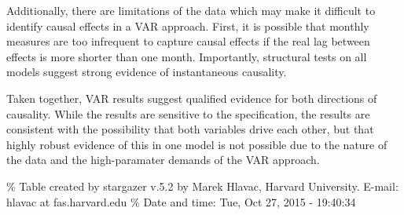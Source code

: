 \documentclass[12pt,article]{article}
\begin{document}
Additionally, there are limitations of the data which may make it
difficult to identify causal effects in a VAR approach. First, it is
possible that monthly measures are too infrequent to capture causal
effects if the real lag between effects is more shorter than one month.
Importantly, structural tests on all models suggest strong evidence of
instantaneous causality.

Taken together, VAR results suggest qualified evidence for both
directions of causality. While the results are sensitive to the
specification, the results are consistent with the possibility that both
variables drive each other, but that highly robust evidence of this in
one model is not possible due to the nature of the data and the
high-paramater demands of the VAR approach. \pagebreak

\% Table created by stargazer v.5.2 by Marek Hlavac, Harvard University.
E-mail: hlavac at fas.harvard.edu \% Date and time: Tue, Oct 27, 2015 -
19:40:34
\end{document}
